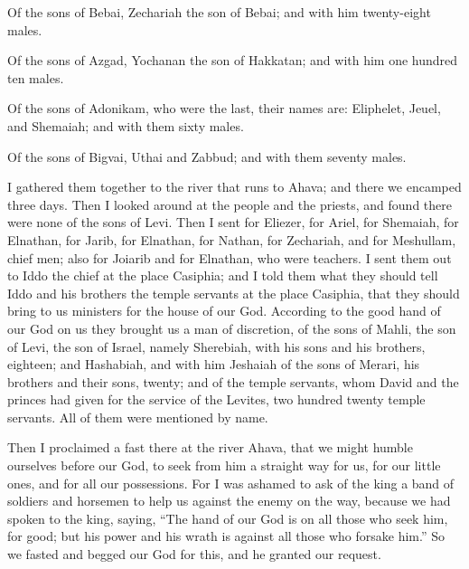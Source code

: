 \myverse{}Of the sons of Bebai, Zechariah the son of Bebai;
and with him twenty-eight males.

\myverse{}Of the sons of Azgad, Yochanan the son of Hakkatan;
and with him one hundred ten males.

\myverse{}Of the sons of Adonikam, who were the last, their
names are: Eliphelet, Jeuel, and Shemaiah; and with them sixty males.

\myverse{}Of the sons of Bigvai, Uthai and Zabbud; and with
them seventy males.

\myverse{}I gathered them together to the river that runs to Ahava; and
there we encamped three days. Then I looked around at the people and the priests, and found there were
none of the sons of Levi.
\myverse{}Then I sent for Eliezer, for Ariel, for Shemaiah, for Elnathan, for Jarib,
for Elnathan, for Nathan, for Zechariah, and for Meshullam, chief men; also for Joiarib and for Elnathan,
who were teachers.
\myverse{}I sent them out to Iddo the chief at the place Casiphia; and I told them what
they should tell Iddo and his brothers the temple servants at the place Casiphia, that they should bring
to us ministers for the house of our God.
\myverse{}According to the good hand of our God on us they brought us a man of discretion,
of the sons of Mahli, the son of Levi, the son of Israel, namely Sherebiah, with his sons and his brothers,
eighteen;
\myverse{}and Hashabiah, and with him Jeshaiah of the sons of Merari, his brothers and
their sons, twenty;
\myverse{}and of the temple servants, whom David and the princes had given for the service
of the Levites, two hundred twenty temple servants. All of them were mentioned by name.

\myverse{}Then I proclaimed a fast there at the river Ahava, that we might
humble ourselves before our God, to seek from him a straight way for us, for our little ones, and for
all our possessions.
\myverse{}For I was ashamed to ask of the king a band of soldiers and horsemen to help
us against the enemy on the way, because we had spoken to the king, saying, “The hand of our God is on
all those who seek him, for good; but his power and his wrath is against all those who forsake him.”
\myverse{}So we fasted and begged our God for this, and he granted our request.

